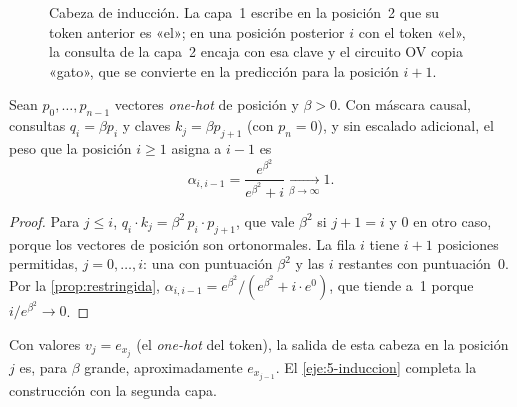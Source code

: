 \begin{figure}[h]
\centering
{}
\caption{Cabeza de inducción. La capa~1 escribe en la posición~2 que su token anterior es «el»; en una posición posterior $i$ con el token «el», la consulta de la capa~2 encaja con esa clave y el circuito OV copia «gato», que se convierte en la predicción para la posición $i+1$.}
\label{fig:induccion}
\end{figure}

\begin{teorema}\label{teo:previo}
Sean $p_0,\dots,p_{n-1}$ vectores \emph{one-hot} de posición y $\beta>0$. Con máscara causal, consultas $q_i=\beta p_i$ y claves $k_j=\beta p_{j+1}$ (con $p_n=0$), y sin escalado adicional, el peso que la posición $i\ge 1$ asigna a $i-1$ es
\[
\alpha_{i,i-1}=\frac{e^{\beta^{2}}}{e^{\beta^{2}}+i}\xrightarrow[\beta\to\infty]{}1 .
\]
\end{teorema}

\begin{proof}
Para $j\le i$, $q_i\cdot k_j=\beta^{2}\,p_i\cdot p_{j+1}$, que vale $\beta^{2}$ si $j+1=i$ y $0$ en otro caso, porque los vectores de posición son ortonormales. La fila $i$ tiene $i+1$ posiciones permitidas, $j=0,\dots,i$: una con puntuación $\beta^{2}$ y las $i$ restantes con puntuación~0. Por la \cref{prop:restringida}, $\alpha_{i,i-1}=e^{\beta^{2}}/(e^{\beta^{2}}+i\cdot e^{0})$, que tiende a~1 porque $i/e^{\beta^{2}}\to 0$.
\end{proof}

Con valores $v_j=e_{x_j}$ (el \emph{one-hot} del token), la salida de esta cabeza en la posición $j$ es, para $\beta$ grande, aproximadamente $e_{x_{j-1}}$. El \cref{eje:5-induccion} completa la construcción con la segunda capa.

